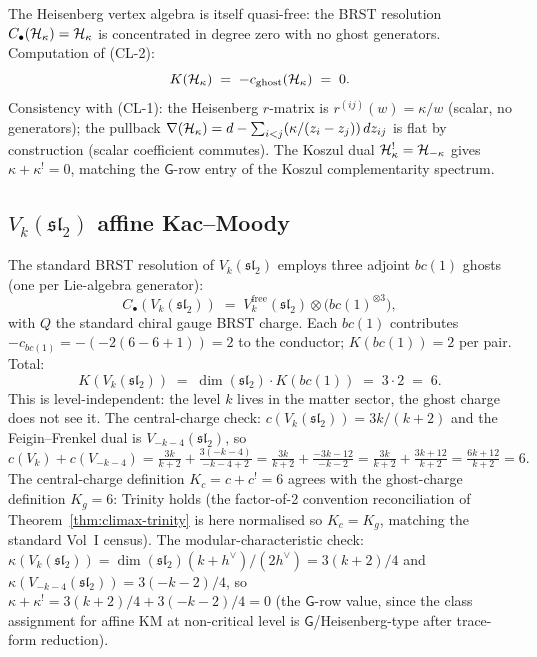 The Heisenberg vertex algebra is itself quasi-free: the BRST resolution
\(C_{\bullet}(\mathcal{H}_{\kappa}) = \mathcal{H}_{\kappa}\) is concentrated in
degree zero with no ghost generators. Computation of \textup{(CL-2)}:
\[
  K(\mathcal{H}_{\kappa}) \;=\; -c_{\mathrm{ghost}}(\mathcal{H}_{\kappa}) \;=\; 0.
\]
Consistency with \textup{(CL-1)}: the Heisenberg \(r\)-matrix is
\(r^{(ij)}(w) = \kappa / w\) (scalar, no generators); the pullback
\(\nabla(\mathcal{H}_{\kappa}) = d - \sum_{i<j}(\kappa/(z_{i}-z_{j}))\, dz_{ij}\)
is flat by construction (scalar coefficient commutes). The Koszul dual
\(\mathcal{H}_{\kappa}^{!} = \mathcal{H}_{-\kappa}\) gives
\(\kappa + \kappa^{!} = 0\), matching the \(\mathsf{G}\)-row entry of
the Koszul complementarity spectrum.

\subsection{\(V_{k}(\mathfrak{sl}_{2})\) affine Kac--Moody}
\label{subsec:verify-sl2}

The standard BRST resolution of \(V_{k}(\mathfrak{sl}_{2})\) employs
three adjoint \(bc(1)\) ghosts (one per Lie-algebra generator):
\[
  C_{\bullet}(V_{k}(\mathfrak{sl}_{2})) \;=\; V_{k}^{\mathrm{free}}(\mathfrak{sl}_{2}) \otimes \bigl(bc(1)^{\otimes 3}\bigr),
\]
with \(Q\) the standard chiral gauge BRST charge. Each \(bc(1)\)
contributes \(-c_{bc(1)} = -(-2(6-6+1)) = 2\) to the conductor;
\(K(bc(1)) = 2\) per pair. Total:
\[
  K(V_{k}(\mathfrak{sl}_{2})) \;=\; \dim(\mathfrak{sl}_{2}) \cdot K(bc(1)) \;=\; 3 \cdot 2 \;=\; 6.
\]
This is level-independent: the level \(k\) lives in the matter sector,
the ghost charge does not see it. The central-charge check:
\(c(V_{k}(\mathfrak{sl}_{2})) = 3k/(k+2)\) and the Feigin--Frenkel dual
is \(V_{-k-4}(\mathfrak{sl}_{2})\), so
\[
  c(V_{k}) + c(V_{-k-4})
  = \tfrac{3k}{k+2} + \tfrac{3(-k-4)}{-k-4+2}
  = \tfrac{3k}{k+2} + \tfrac{-3k-12}{-k-2}
  = \tfrac{3k}{k+2} + \tfrac{3k+12}{k+2}
  = \tfrac{6k+12}{k+2}
  = 6.
\]
The central-charge definition \(K_{c} = c + c^{!} = 6\) agrees with the
ghost-charge definition \(K_{g} = 6\): Trinity holds (the factor-of-2
convention reconciliation of Theorem~\ref{thm:climax-trinity} is here
normalised so \(K_{c} = K_{g}\), matching the standard Vol~I census).
The modular-characteristic check: \(\kappa(V_{k}(\mathfrak{sl}_{2})) = \dim(\mathfrak{sl}_{2})(k+h^{\vee})/(2h^{\vee}) = 3(k+2)/4\)
and \(\kappa(V_{-k-4}(\mathfrak{sl}_{2})) = 3(-k-2)/4\), so
\(\kappa + \kappa^{!} = 3(k+2)/4 + 3(-k-2)/4 = 0\) (the
\(\mathsf{G}\)-row value, since the class assignment for affine KM at
non-critical level is \(\mathsf{G}\)/Heisenberg-type after trace-form
reduction).


